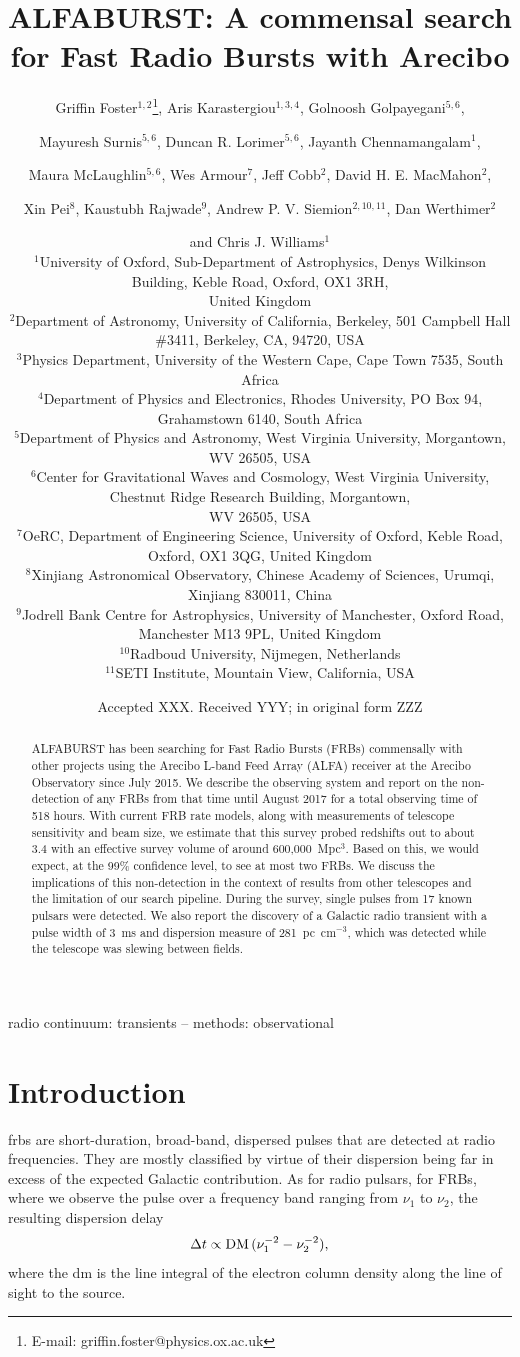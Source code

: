 \documentclass[a4paper,fleqn,usenatbib]{mnras}
\title[The ALFABURST Commensal FRB Survey]{ALFABURST: A commensal search for
Fast Radio Bursts with Arecibo}
\author[G. Foster et al.]{Griffin Foster$^{1,2}$\thanks{E-mail: griffin.foster@physics.ox.ac.uk},
Aris Karastergiou$^{1,3,4}$,
Golnoosh Golpayegani$^{5,6}$,
\and Mayuresh Surnis$^{5,6}$, 
Duncan R. Lorimer$^{5,6}$,
Jayanth Chennamangalam$^{1}$,
\and Maura McLaughlin$^{5,6}$,
Wes Armour$^{7}$,
Jeff Cobb$^{2}$,
David H. E. MacMahon$^{2}$,
\and Xin Pei$^{8}$,
Kaustubh Rajwade$^{9}$, 
Andrew P. V. Siemion$^{2,10,11}$,
Dan Werthimer$^{2}$
\and and Chris J. Williams$^{1}$
\\
$^{1}$University of Oxford, Sub-Department of Astrophysics, Denys Wilkinson Building, Keble Road, Oxford, OX1 3RH,\\United Kingdom\\
$^{2}$Department of Astronomy, University of California, Berkeley, 501 Campbell Hall \#3411, Berkeley, CA, 94720, USA\\
$^{3}$Physics Department, University of the Western Cape, Cape Town 7535, South Africa\\
$^{4}$Department of Physics and Electronics, Rhodes University, PO Box 94, Grahamstown 6140, South Africa\\
$^{5}$Department of Physics and Astronomy, West Virginia University, Morgantown, WV 26505, USA\\
$^{6}$Center for Gravitational Waves and Cosmology, West Virginia University, Chestnut Ridge Research Building, Morgantown,\\ WV 26505, USA\\
$^{7}$OeRC, Department of Engineering Science, University of Oxford, Keble Road, Oxford, OX1 3QG, United Kingdom\\
$^{8}$Xinjiang Astronomical Observatory, Chinese Academy of Sciences, Urumqi, Xinjiang 830011, China\\
$^{9}$Jodrell Bank Centre for Astrophysics, University of Manchester, Oxford Road, Manchester M13 9PL, United Kingdom\\
$^{10}$Radboud University, Nijmegen, Netherlands\\
$^{11}$SETI Institute, Mountain View, California, USA\\
}
\date{Accepted XXX. Received YYY; in original form ZZZ}
\begin{document}
\label{firstpage}
\pagerange{\pageref{firstpage}--\pageref{lastpage}}
\maketitle

\begin{abstract}
ALFABURST has been searching for Fast Radio Bursts (FRBs) commensally with other
projects using the Arecibo L-band Feed Array (ALFA) receiver at the Arecibo
Observatory since July 2015. We describe the observing system and report on the
non-detection of any FRBs from that time until August 2017 for a total observing
time of 518 hours.  With current FRB rate models, along with measurements of
telescope sensitivity and beam size, we estimate that this survey probed
redshifts out to about 3.4 with an effective survey volume of around
600,000~Mpc$^3$. Based on this, we would expect, at the 99\% confidence level,
to see at most two FRBs.  We discuss the implications of this non-detection in
the context of results from other telescopes and the limitation of our search
pipeline.  During the survey, single pulses from 17 known pulsars were detected.
We also report the discovery of a Galactic radio transient with a pulse width of
3~ms and dispersion measure of 281~pc~cm$^{-3}$, which was detected while the
telescope was slewing between fields.
\end{abstract}

\begin{keywords}
radio continuum: transients -- methods: observational
\end{keywords}


\section{Introduction}
\label{sec:intro}

\glspl{frb} are short-duration, broad-band, dispersed pulses that are detected
at radio frequencies. They are mostly classified by virtue of their dispersion
being far in excess of the expected Galactic contribution. As for radio pulsars,
for FRBs, where we observe the pulse over a frequency band ranging from $\nu_1$
to $\nu_2$, the resulting dispersion delay 
%
\begin{equation}
\Delta t \propto {\rm DM} \, (\nu_1^{-2} - \nu_2^{-2}),
\end{equation}
%
where the \gls{dm} is the line integral of the electron column
density along the line of sight to the source.
\end{document}
